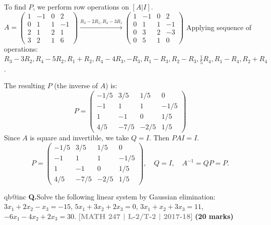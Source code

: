 \documentclass[12pt,a3paper]{article}
\makeatletter
\newcommand{\yr}[1]{\hfill\textcolor{gray}{\small\textbf{[#1]}}}
\newcommand{\mk}[1]{\textcolor{orange!70!black}{\small\textbf{(#1 marks)}}}
\newcounter{qnum}
\newcommand{\Q}[1]{%
  \csname qb@inc\endcsname
  \needspace{4\baselineskip}
  \refstepcounter{qnum}
  \vspace{6pt}
  \noindent\textbf{Q\theqnum.}\enspace #1\par
}
\makeatother
\begin{document}
\begin{tcolorbox}[enhanced,breakable,
  colback=cB!4,colframe=cB,boxrule=0.8pt,arc=5pt,
  title={\textbf{Answer --- $PAQ=I$ for $4\times4$ Matrix; $A^{-1}=QP$}},
  fonttitle=\bfseries\color{white},colbacktitle=cB]

To find $P$, we perform row operations on $[A|I]$. 
$A=\begin{pmatrix}1&-1&0&2\\0&1&1&-1\\2&1&2&1\\3&2&1&6\end{pmatrix} \xrightarrow{R_3-2R_1, R_4-3R_1} \begin{pmatrix}1&-1&0&2\\0&1&1&-1\\0&3&2&-3\\0&5&1&0\end{pmatrix}$
Applying sequence of operations: $R_3-3R_2, R_4-5R_2, R_1+R_2, R_4-4R_3, -R_3, R_1-R_3, R_2-R_3, \frac{1}{5}R_4, R_1-R_4, R_2+R_4$.

The resulting $P$ (the inverse of $A$) is:
\[ P = \begin{pmatrix} -1/5 & 3/5 & 1/5 & 0 \\ -1 & 1 & 1 & -1/5 \\ 1 & -1 & 0 & 1/5 \\ 4/5 & -7/5 & -2/5 & 1/5 \end{pmatrix} \]
Since $A$ is square and invertible, we take $Q=I$. Then $PAI=I$.
\[ \boxed{P = \begin{pmatrix} -1/5 & 3/5 & 1/5 & 0 \\ -1 & 1 & 1 & -1/5 \\ 1 & -1 & 0 & 1/5 \\ 4/5 & -7/5 & -2/5 & 1/5 \end{pmatrix}, \quad Q = I, \quad A^{-1} = QP = P.} \]
\end{tcolorbox}



\Q{Solve the following linear system by Gaussian elimination:
$3x_1 + 2x_2 - x_3 = -15$, $5x_1 + 3x_2 + 2x_3 = 0$, $3x_1 + x_2 + 3x_3 = 11$, $-6x_1 - 4x_2 + 2x_3 = 30$.
\yr{MATH 247 | L-2/T-2 | 2017-18} \mk{20}}
\end{document}

